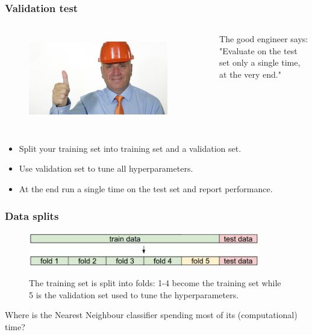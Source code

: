 \begin{frame}
        \frametitle{Validation test}

        \begin{columns}
                \begin{figure}
                        \includegraphics[width=0.9\textwidth]{Pics/good_engineer.jpg} \\
                \end{figure}
                The good engineer says: "Evaluate on the test set only a single time, at the very end."
        \end{columns}

	\begin{itemize}
		\item Split your training set into training set and a validation set. 
		\item Use validation set to tune all hyperparameters. 
		\item At the end run a single time on the test set and report performance.        
	\end{itemize}

\end{frame}

\begin{frame}
	\frametitle{Data splits}

	\begin{figure}
		\includegraphics[width=0.9\textwidth]{Pics/crossval.jpeg} \\
		\caption{The training set is split into folds: 1-4 become the training set while 5 is the validation set used to tune the hyperparameters.}
     	\end{figure}

	Where is the Nearest Neighbour classifier spending most of its (computational) time?

\end{frame}

